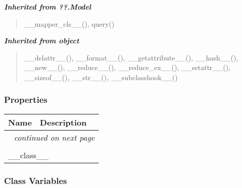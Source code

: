 \large{\textbf{\textit{Inherited from ??.Model}}}

\begin{quote}
\_\_mapper\_cls\_\_(), query()
\end{quote}

\large{\textbf{\textit{Inherited from object}}}

\begin{quote}
\_\_delattr\_\_(), \_\_format\_\_(), \_\_getattribute\_\_(), \_\_hash\_\_(), \_\_new\_\_(), \_\_reduce\_\_(), \_\_reduce\_ex\_\_(), \_\_setattr\_\_(), \_\_sizeof\_\_(), \_\_str\_\_(), \_\_subclasshook\_\_()
\end{quote}


  \subsubsection{Properties}

    \vspace{-1cm}
\hspace{\varindent}\begin{longtable}{|p{\varnamewidth}|p{\vardescrwidth}|l}
\cline{1-2}
\cline{1-2} \centering \textbf{Name} & \centering \textbf{Description}& \\
\cline{1-2}
\endhead\cline{1-2}\multicolumn{3}{r}{\small\textit{continued on next page}}\\\endfoot\cline{1-2}
\endlastfoot\multicolumn{2}{|l|}{\textit{Inherited from object}}\\
\multicolumn{2}{|p{\varwidth}|}{\raggedright \_\_class\_\_}\\
\cline{1-2}
\end{longtable}



  \subsubsection{Class Variables}

